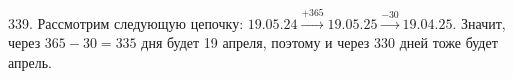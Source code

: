 339. Рассмотрим следующую цепочку: $19.05.24\stackrel{+365}{\rightarrow}19.05.25\stackrel{-30}{\rightarrow}19.04.25.$ Значит, через $365-30=335$ дня будет 19 апреля, поэтому и через 330 дней тоже будет апрель.\\

